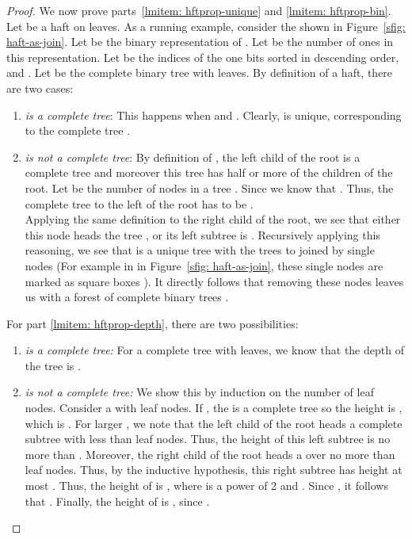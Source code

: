 \documentclass[11pt, letter]{article}
\begin{document}
\begin{proof}
We now prove parts~\ref{lmitem: hftprop-unique} and \ref{lmitem: hftprop-bin}. Let  be a haft on  leaves. As a
running example, consider the   shown in Figure~\ref{sfig: haft-as-join}.   Let  be the binary
representation of . Let  be the number of ones  in this representation. Let  be the
indices of the one bits sorted in descending order, and . Let  be the complete
binary tree with  leaves. By definition of a haft, there are two cases:
\begin{enumerate}
\item  \emph{  is a complete tree}: This happens when  and . Clearly,  is unique, corresponding
to the complete tree .
\item \emph{  is not a complete tree}: By definition of , the left child of the root is a complete tree and
moreover this tree has half or more of the children of the root. Let  be the number of nodes in a tree .
Since  we know that . Thus, the
complete tree to the left of the root has to be . \\
 Applying the same definition to the right child of the root, we see that either this node heads the tree , or
its left subtree is . Recursively applying this reasoning,  we see that  is a unique tree with
the trees  to  joined by  single nodes (For example in in Figure~\ref{sfig:
haft-as-join}, these  single nodes are marked as square boxes ). It directly follows  that removing these 
nodes leaves us with a forest of  complete binary trees .
\end{enumerate}



For part \ref{lmitem: hftprop-depth}, there are two possibilities:
 \begin{enumerate}
 \item \emph{ is a complete tree:} For a complete tree with  leaves, we know that the depth of the tree is .
\item \emph{ is not a complete tree:} 
We show this by induction on the number of leaf nodes. Consider a  with  leaf nodes. If , the  is
a complete tree so the height is , which is . For larger , we note that the left child of the root heads
a complete subtree with less than  leaf nodes. Thus, the height of this left subtree is no more than .
Moreover, the right child of the root heads a  over no more than  leaf nodes. Thus, by the
inductive hypothesis, this right subtree has height at most . Thus, the height of
 is , where  is a power of 2 and . Since ,
it follows that . Finally, the height of  is , since .

\end{enumerate}


\end{proof}
\end{document}
